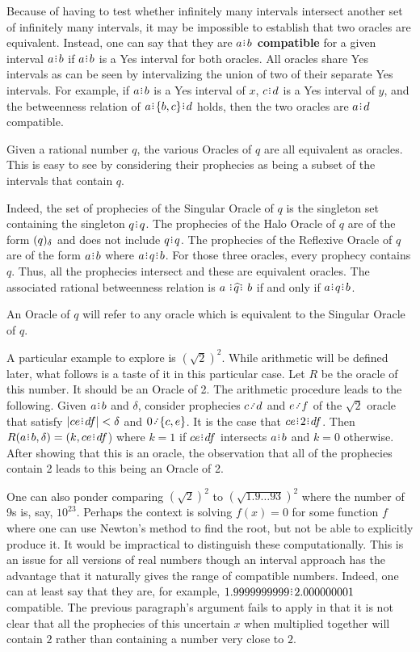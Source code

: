 \documentclass[12pt]{article}
\begin{document}
Because of having to test whether infinitely many intervals intersect another set of infinitely many intervals, it may be impossible to establish that two oracles are equivalent. Instead, one can say that they are \textbf{$a\rint b$ compatible} for a given interval $a\rint b$ if $a\rint b$ is a Yes interval for both oracles. All oracles share Yes intervals as can be seen by intervalizing the union of two of their separate Yes intervals. For example, if $a\rint b$ is a Yes interval of $x$, $c\rint d$ is a Yes interval of $y$, and the betweenness relation of $a\rint \{b,c\}\rint d$ holds, then the two oracles are $a\rint d$ compatible.  


 Given a rational number $q$, the various Oracles of $q$ are all equivalent as oracles. This is easy to see by considering their prophecies as being a subset of the intervals that contain $q$.
 
 Indeed, the set of prophecies of the Singular Oracle of $q$ is the singleton set containing the singleton $q\rint q$. The prophecies of the Halo Oracle of $q$ are of the form $(q)_{\delta}$ and does not include $q \rint q$. The prophecies of the Reflexive Oracle of $q$ are of the form $a\rint b$ where $a\rint q \rint b$.  For those three oracles, every prophecy contains $q$. Thus, all the prophecies intersect and these are equivalent oracles. The associated rational betweenness relation is $a \xora[q] b$ if and only if $a\rint q \rint b$. 
 
 An Oracle of $q$ will refer to any oracle which is equivalent to the Singular Oracle of $q$. 

A particular example to explore is $(\sqrt{2})^2$. While arithmetic will be defined later, what follows is a taste of it in this particular case. Let $R$ be the oracle of this number. It should be an Oracle of 2. The arithmetic procedure leads to the following. Given $a\rint b$ and $\delta$, consider prophecies $c\lte d$ and $e\lte f$ of the $\sqrt{2}$ oracle that satisfy $|ce\rint df| < \delta$ and $0\lte \{c,e\}$. It is the case that $ce\rint 2\rint df$. Then $R(a\rint b, \delta) = (k, ce\rint df$) where $k = 1$ if $ce\rint df$ intersects $a\rint b$ and $k=0$ otherwise. After showing that this is an oracle, the observation that all of the prophecies contain 2 leads to this being an Oracle of 2. 

One can also ponder comparing $(\sqrt{2})^2$ to $(\sqrt{1.9\ldots93})^2$ where the number of 9s is, say, $10^{23}$. Perhaps  the context is solving $f(x) = 0$ for some function $f$ where one can use Newton's method to find the root, but not be able to explicitly produce it. It would be impractical to distinguish these computationally. This is an issue for all versions of real numbers though an interval approach has the advantage that it naturally gives the range of compatible numbers. Indeed, one can at least say that they are, for example, $1.9999999999\rint 2.000000001$ compatible. The previous paragraph's argument fails to apply in that it is not clear that all the prophecies of this uncertain $x$ when multiplied together will contain $2$ rather than containing a number very close to $2$. 
\end{document}
